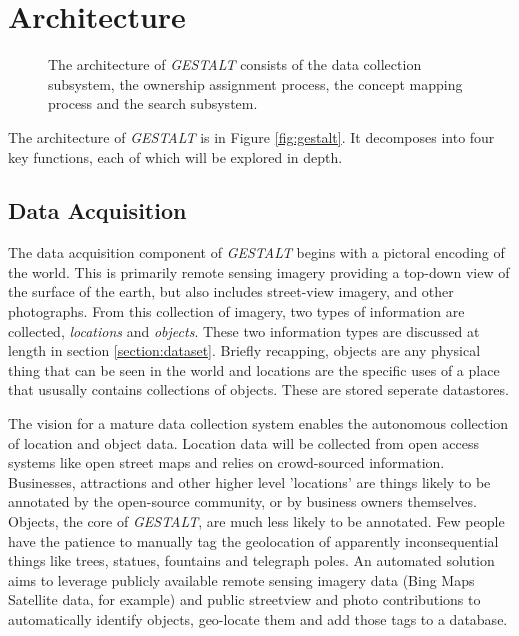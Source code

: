 \section{Architecture}
\label{section:architecture}

\begin{figure*}[t]
	\label{fig:architecture}
	
	\centering
	\caption[widht=\textwidth]{The architecture of \textit{GESTALT} consists of the data collection subsystem, the ownership assignment process, the concept mapping process and the search subsystem.}
\end{figure*}

The architecture of \textit{GESTALT} is in Figure \ref{fig:gestalt}. It decomposes into four key functions, each of which will be explored in depth. 

\subsection{Data Acquisition}
The data acquisition component of \textit{GESTALT} begins with a pictoral encoding of the world. 
This is primarily remote sensing imagery providing a top-down view of the surface of the earth, but also includes street-view imagery, and other photographs. 
From this collection of imagery, two types of information are collected, \textit{locations} and \textit{objects}. 
These two information types are discussed at length in section \ref{section:dataset}. 
Briefly recapping, objects are any physical thing that can be seen in the world and locations are the specific uses of a place that ususally contains collections of objects. 
These are stored seperate datastores. 

The vision for a mature data collection system enables the autonomous collection of location and object data. 
Location data will be collected from open access systems like open street maps and relies on crowd-sourced information. 
Businesses, attractions and other higher level 'locations' are things likely to be annotated by the open-source community, or by business owners themselves. 
Objects, the core of \textit{GESTALT}, are much less likely to be annotated. Few people have the patience to manually tag the geolocation of apparently inconsequential things like trees, statues, fountains and telegraph poles. 
An automated solution aims to leverage publicly available remote sensing imagery data (Bing Maps Satellite data, for example) and public streetview and photo contributions to automatically identify objects, geo-locate them and add those tags to a database. 

